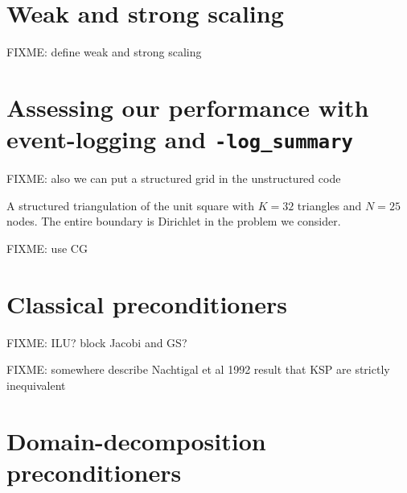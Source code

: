 
\section{Weak and strong scaling}

FIXME: define weak and strong scaling

\section{Assessing our performance with event-logging and \texttt{-log\_summary}}

\vspace{4cm}

FIXME: also we can put a structured grid in the unstructured code

\begin{marginfigure}

\caption{A structured triangulation of the unit square with $K=32$ triangles and $N=25$ nodes.  The entire boundary is Dirichlet in the problem we consider.}
\label{fig:structuredfem}
\end{marginfigure}

FIXME: use CG

\section{Classical preconditioners}

FIXME:  ILU?  block Jacobi and GS?

FIXME: somewhere describe Nachtigal et al 1992 result that KSP are strictly inequivalent

\begin{comment}
> Hi all,
>
> Is weighted Jacobi available as a preconditioner ? I can't find it in the
> list of preconditioners. If not, what is the rationale between this choice
> ? It is pretty straightforward to code, so if it is not available I can do
> it without problem I guess, but I am just wondering. In the matrix-free
> case where SOR is not available by default, it may be better than pure
> Jacobi, and much easier to parallelize than SOR.
>
>   Timothee Nicolas

I believe what you are looking for is defined by the following options
  -ksp_type richardson
  -ksp_richardson_scale <value>
  -pc_type jacobi

Thanks,
  Dave May
\end{comment}

\section{Domain-decomposition preconditioners}

